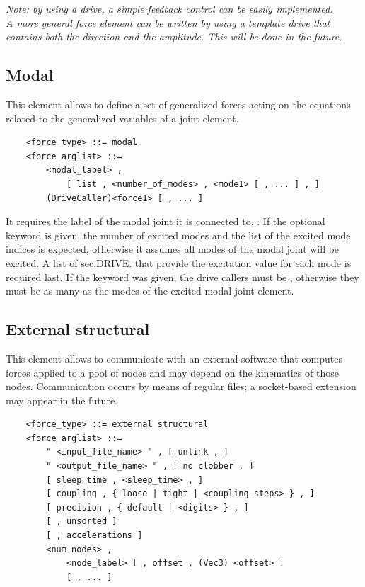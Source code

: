 \noindent
{\em 
Note: by using a  drive, a simple feedback control can be easily
implemented. \\
A more general force element can be written by using a template drive
that contains both the direction and the amplitude. This will be done in the
future. 
}

\subsection{Modal}
This element allows to define a set of generalized forces
acting on the equations related to the generalized variables
of a  joint element.
\begin{verbatim}
    <force_type> ::= modal
    <force_arglist> ::=
        <modal_label> ,
            [ list , <number_of_modes> , <mode1> [ , ... ] , ]
        (DriveCaller)<force1> [ , ... ]
\end{verbatim}
It requires the label of the modal joint it is connected to,
.
If the optional keyword  is given, the number of excited modes
 and the list of the excited mode indices
is expected, otherwise it assumes all modes of the 
modal joint will be excited.
A list of
\hyperref{\kw{drive callers}}{\kw{drive callers} (see Section~}{)}{sec:DRIVE}.
that provide the excitation value for each mode is required last.
If the keyword  was given, the drive callers
must be , otherwise they must be as many
as the modes of the excited modal joint element.


\subsection{External structural}
This element allows to communicate with an external software that computes
forces applied to a pool of nodes and may depend on the kinematics of those
nodes.
Communication occurs by means of regular files; a socket-based extension
may appear in the future.
\begin{verbatim}
    <force_type> ::= external structural
    <force_arglist> ::=
        " <input_file_name> " , [ unlink , ]
        " <output_file_name> " , [ no clobber , ]
        [ sleep time , <sleep_time> , ]
        [ coupling , { loose | tight | <coupling_steps> } , ]
        [ precision , { default | <digits> } , ]
        [ , unsorted ]
        [ , accelerations ]
        <num_nodes> ,
            <node_label> [ , offset , (Vec3) <offset> ]
            [ , ... ]
\end{verbatim}


